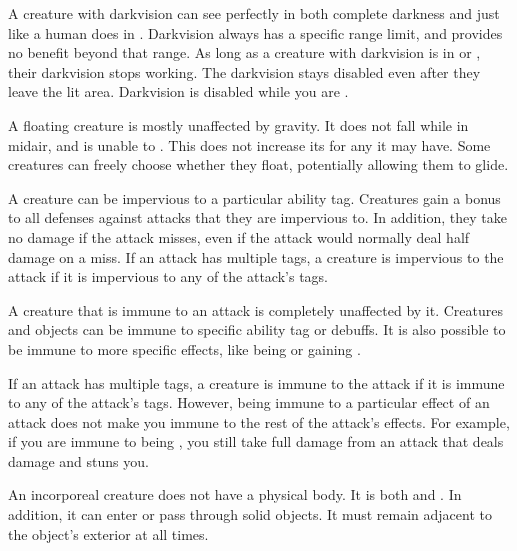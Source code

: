   A creature with darkvision can see perfectly in both complete darkness and  just like a human does in .
  Darkvision always has a specific range limit, and provides no benefit beyond that range.
  As long as a creature with darkvision is in  or , their darkvision stops working.
  The darkvision  stays disabled even after they leave the lit area.
  Darkvision is disabled while you are \dazzled.

  A floating creature is mostly unaffected by gravity.
  It does not fall while in midair, and is unable to .
  This does not increase its  for any  it may have.
  Some creatures can freely choose whether they float, potentially allowing them to glide.

  A creature can be impervious to a particular ability tag.
  Creatures gain a  bonus to all defenses against attacks that they are impervious to.
  In addition, they take no damage if the attack misses, even if the attack would normally deal half damage on a miss.
  If an attack has multiple tags, a creature is impervious to the attack if it is impervious to any of the attack's tags.

  A creature that is immune to an attack is completely unaffected by it.
  Creatures and objects can be immune to specific ability tag or debuffs.
  It is also possible to be immune to more specific effects, like being \grappled or gaining .

  If an attack has multiple tags, a creature is immune to the attack if it is immune to any of the attack's tags.
  However, being immune to a particular effect of an attack does not make you immune to the rest of the attack's effects.
  For example, if you are immune to being \stunned, you still take full damage from an attack that deals damage and stuns you.

  An incorporeal creature does not have a physical body.
  It is both  and .
  In addition, it can enter or pass through solid objects.
  It must remain adjacent to the object's exterior at all times.

